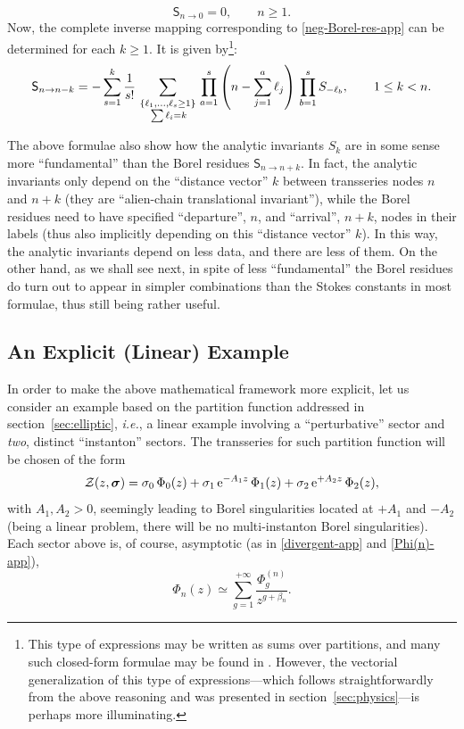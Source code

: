 \documentclass[11pt,a4paper]{article}
\newcommand{\CZ}{{\cal Z}}
\newcommand{\be}{\begin{equation}}
\newcommand{\ee}{\end{equation}}
\newcommand{\rme}{{\mathrm{e}}}
\begin{document}
%
\be
\mathsf{S}_{n\to0}=0, \qquad n\ge1.
\ee
%
\noindent
Now, the complete inverse mapping corresponding to \eqref{neg-Borel-res-app} can be determined for each $k\ge 1$. It is given by\footnote{This type of expressions may be written as sums over partitions, and many such closed-form formulae may be found in \cite{asv11, as13}. However, the vectorial generalization of this type of expressions---which follows straightforwardly from the above reasoning and was presented in section~\ref{sec:physics}---is perhaps more illuminating.}:
%
\be
\mathsf{S}_{n\to n-k} = - \sum_{s=1}^{k} \frac{1}{s!}\, \sum_{\substack{\left\{ \ell_1,\ldots,\ell_s\ge 1 \right\} \\ \vphantom{\frac{1}{2}} \sum \ell_i=k}}\, \prod_{a=1}^{s} \left( n - \sum_{j=1}^{a} \ell_j \right)\, \prod_{b=1}^{s} S_{-\ell_b}, \qquad  1\le k < n.
\ee

The above formulae also show how the analytic invariants $S_k$ are in some sense more ``fundamental'' than the Borel residues $\mathsf{S}_{n\to n+k}$. In fact, the analytic invariants only depend on the ``distance vector'' $k$ between transseries nodes $n$ and $n+k$ (they are ``alien-chain translational invariant''), while the Borel residues need to have specified ``departure'', $n$, and ``arrival'', $n+k$, nodes in their labels (thus also implicitly depending on this ``distance vector'' $k$). In this way, the analytic invariants depend on less data, and there are less of them. On the other hand, as we shall see next, in spite of less ``fundamental'' the Borel residues do turn out to appear in simpler combinations than the Stokes constants in most formulae, thus still being rather useful.

\subsection*{An Explicit (Linear) Example}

In order to make the above mathematical framework more explicit, let us consider an example based on the partition function addressed in section~\ref{sec:elliptic}, \textit{i.e.}, a linear example involving a ``perturbative'' sector and \textit{two}, distinct ``instanton'' sectors. The transseries for such partition function will be chosen of the form
%
\be
\label{3-Z-app}
\CZ (z, \boldsymbol{\sigma}) = \sigma_0\, \Phi_0 (z) + \sigma_1\, \rme^{-A_1 z}\, \Phi_1 (z) + \sigma_2\, \rme^{+A_2 z}\, \Phi_2 (z),
\ee
%
\noindent
with $A_1, A_2 > 0$, seemingly leading to Borel singularities located at $+A_1$ and $-A_2$ (being a linear problem, there will be no multi-instanton Borel singularities). Each sector above is, of course, asymptotic (as in \eqref{divergent-app} and \eqref{Phi(n)-app}),
%
\be
\label{3-Z-Phi-app}
\Phi_n (z) \simeq \sum_{g=1}^{+\infty} \frac{\Phi_g^{(n)}}{z^{g + \beta_n}}.
\ee
\end{document}
